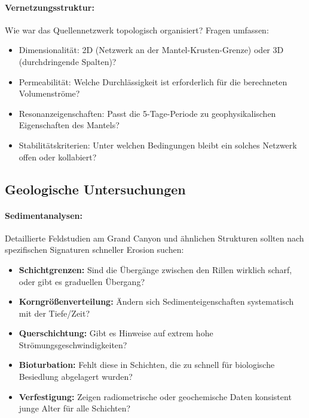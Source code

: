 ﻿\documentclass[12pt,a4paper]{report}
\begin{document}
\paragraph{Vernetzungsstruktur:}
Wie war das Quellennetzwerk topologisch organisiert? Fragen umfassen:
\begin{itemize}
	\item Dimensionalität: 2D (Netzwerk an der Mantel-Krusten-Grenze) oder 3D (durchdringende Spalten)?
	\item Permeabilität: Welche Durchlässigkeit ist erforderlich für die berechneten Volumenströme?
	\item Resonanzeigenschaften: Passt die 5-Tage-Periode zu geophysikalischen Eigenschaften des Mantels?
	\item Stabilitätskriterien: Unter welchen Bedingungen bleibt ein solches Netzwerk offen oder kollabiert?
\end{itemize}

\subsection{Geologische Untersuchungen}

\paragraph{Sedimentanalysen:}
Detaillierte Feldstudien am Grand Canyon und ähnlichen Strukturen sollten nach spezifischen Signaturen schneller Erosion suchen:

\begin{itemize}
	\item \textbf{Schichtgrenzen:} Sind die Übergänge zwischen den Rillen wirklich scharf, oder gibt es graduellen Übergang?
	
	\item \textbf{Korngrößenverteilung:} Ändern sich Sedimenteigenschaften systematisch mit der Tiefe/Zeit?
	
	\item \textbf{Querschichtung:} Gibt es Hinweise auf extrem hohe Strömungsgeschwindigkeiten?
	
	\item \textbf{Bioturbation:} Fehlt diese in Schichten, die zu schnell für biologische Besiedlung abgelagert wurden?
	
	\item \textbf{Verfestigung:} Zeigen radiometrische oder geochemische Daten konsistent junge Alter für alle Schichten?
\end{itemize}
\end{document}
